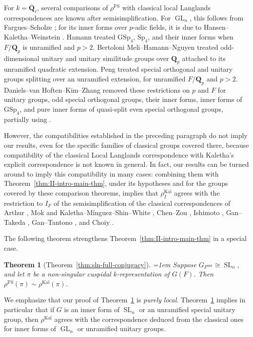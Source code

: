 \documentclass[reqno]{amsart}
\numberwithin{equation}{subsection}
\newcommand{\Q}{\mathbf{Q}}
\newcommand{\ol}[1]{\overline{#1}}
\DeclareMathOperator{\GL}{GL}
\DeclareMathOperator{\SL}{SL}
\DeclareMathOperator{\unr}{unr}
\DeclareMathOperator{\FS}{FS}
\DeclareMathOperator{\Kal}{Kal}
\newtheorem{thm}{Theorem}[subsection]
\theoremstyle{remark}
\numberwithin{equation}{subsection}
\numberwithin{figure}{subsection}
\begin{document}
For $k=\ol\Q_\ell$, several comparisons of $\rho^{\FS}$ with classical local Langlands correspondences are known after semisimplification. For $\GL_n$, this follows from Fargues--Scholze \cite[Theorem I.9.6(viii)--(ix)]{FS}; for its inner forms over $p$-adic fields, it is due to Hansen--Kaletha--Weinstein \cite[Theorem 1.0.3]{HKW22}. Hamann \cite[Theorem 1.1 and Corollary 8.3]{Ham25} treated $\mathrm{GSp}_4$, $\mathrm{Sp}_4$, and their inner forms when $F/\Q_p$ is unramified and $p>2$. Bertoloni Meli--Hamann--Nguyen \cite[Theorem 1.1]{BMHN24} treated odd-dimensional unitary and unitary similitude groups over $\Q_p$ attached to its unramified quadratic extension. Peng \cite[Theorem A]{Pen26} treated special orthogonal and unitary groups splitting over an unramified extension, for unramified $F/\Q_p$ and $p>2$. Daniels--van Hoften--Kim--Zhang \cite[Theorem II]{DvHKZ26} removed these restrictions on $p$ and $F$ for unitary groups, odd special orthogonal groups, their inner forms, inner forms of $\mathrm{GSp}_4$, and pure inner forms of quasi-split even special orthogonal groups, partially using \cite{Han26}.

However, the compatibilities established in the preceding paragraph do not imply our results, even for the specific families of classical groups covered there, because compatibility of the classical Local Langlands correspondence with Kaletha's explicit correspondence is not known in general. In fact, our results can be turned around to imply this compatibility in many cases: combining them with Theorem~\ref{thm:II-intro-main-thm}, under its hypotheses and for the groups covered by these comparison theorems, implies that $\rho_I^{\Kal}$ agrees with the restriction to $I_F$ of the semisimplification of the classical correspondences of Arthur \cite{Art13}, Mok and Kaletha--M\'{i}nguez--Shin--White \cite{Mok15,KMSW14}, Chen--Zou \cite{CZ21}, Ishimoto \cite{Ish24}, Gan--Takeda \cite{GT10,GT11}, Gan--Tantono \cite{GT14}, and Choiy \cite{Cho17}.

The following theorem strengthens Theorem~\ref{thm:II-intro-main-thm} in a special case.

\begin{thm}[Theorem~\ref{thm:sln-full-conjugacy}]\label{thm:II-intro-type-A}\emergencystretch=1em
Suppose $G_{F^{\unr}} \cong \SL_n$, and let $\pi$ be a non-singular cuspidal $k$-representation of $G(F)$. Then $\rho^{\FS}(\pi) \sim \rho^{\Kal}(\pi)$.
\end{thm}

We emphasize that our proof of Theorem~\ref{thm:II-intro-type-A} is \emph{purely local}. Theorem~\ref{thm:II-intro-type-A} implies in particular that if $G$ is an inner form of $\SL_n$ or an unramified special unitary group, then $\rho^{\Kal}$ agrees with the correspondence deduced from the classical ones for inner forms of $\GL_n$ or unramified unitary groups.
\end{document}
